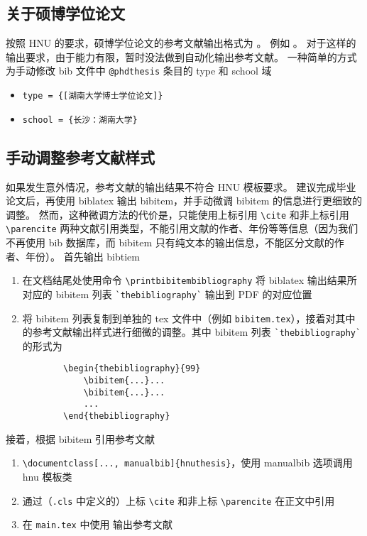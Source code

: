 \subsection*{关于硕博学位论文}

按照 HNU 的要求，硕博学位论文的参考文献输出格式为 。
例如 。
对于这样的输出要求，由于能力有限，暂时没法做到自动化输出参考文献。
一种简单的方式为手动修改 bib 文件中 \verb|@phdthesis| 条目的 type 和 school 域
\begin{itemize}
    \item \verb|type = {[湖南大学博士学位论文]}|
    \item \verb|school = {长沙：湖南大学}|
\end{itemize}

\subsection{手动调整参考文献样式}\label{subsec.bibitem}
如果发生意外情况，参考文献的输出结果不符合 HNU 模板要求。
建议完成毕业论文后，再使用 biblatex 输出 bibitem，并手动微调 bibitem 的信息进行更细致的调整。
然而，这种微调方法的代价是，只能使用上标引用 \verb|\cite| 和非上标引用 \verb|\parencite| 两种文献引用类型，不能引用文献的作者、年份等等信息（因为我们不再使用 bib 数据库，而 bibitem 只有纯文本的输出信息，不能区分文献的作者、年份）。
首先输出 bibtiem
\begin{enumerate}
    \item 在文档结尾处使用命令 \verb|\printbibitembibliography| 将 biblatex 输出结果所对应的 bibitem 列表 \verb|`thebibliography`| 输出到 PDF 的对应位置
    \item 将 bibitem 列表复制到单独的 tex 文件中（例如 \verb|bibitem.tex|），接着对其中的参考文献输出样式进行细微的调整。其中 bibitem 列表 \verb|`thebibliography`| 的形式为
    \begin{verbatim}
        \begin{thebibliography}{99}
            \bibitem{...}...
            \bibitem{...}...
            ... 
        \end{thebibliography}
    \end{verbatim}
\end{enumerate}
接着，根据 bibitem 引用参考文献
\begin{enumerate}
    \item \verb|\documentclass[..., manualbib]{hnuthesis}|，使用 manualbib 选项调用 hnu 模板类
    \item 通过（\verb|.cls| 中定义的）上标 \verb|\cite| 和非上标 \verb|\parencite| 在正文中引用
    \item 在 \verb|main.tex| 中使用 \verb|| 输出参考文献
\end{enumerate}
